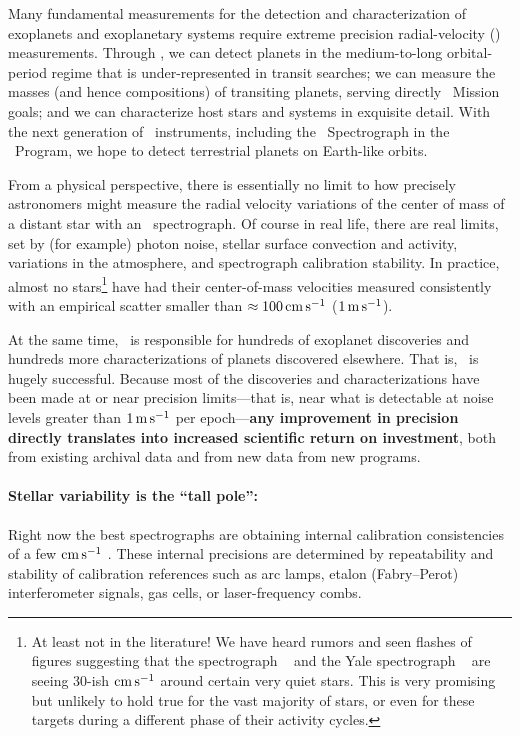 \documentclass[12pt, letterpaper]{article}
\begin{document}
\sloppy\sloppypar\raggedbottom\frenchspacing


Many fundamental measurements for the detection and characterization of 
exoplanets and exoplanetary systems require extreme precision radial-velocity (\EPRV)
measurements.
Through \EPRV, we can detect planets in the medium-to-long 
orbital-period regime that is under-represented in transit searches;
we can measure the 
masses (and hence compositions) of transiting planets,
serving directly \TESS\ Mission goals;
and we can characterize host stars and systems in exquisite detail.
With the next generation of \EPRV\ 
instruments, including the \NEID\ Spectrograph in the \NNEXPLORE\ Program,
we hope to detect terrestrial planets on Earth-like orbits.

From a physical perspective, there is essentially no limit to how
precisely astronomers might measure the radial velocity variations
of the center of mass of a distant star with an \EPRV\ spectrograph.
Of course in real life, there are real limits, set
by (for example) photon noise, stellar surface convection and activity,
variations in the atmosphere, and spectrograph calibration stability.
In practice, almost no stars\footnote{%
  At least not in the literature! We have heard rumors and 
  seen flashes of figures suggesting that the  spectrograph
  \ESPRESSO\ \citep{Pepe2010} and the Yale spectrograph \EXPRES\ 
  \citep{Jurgenson2016} are seeing 
  30-ish ${\mathrm{cm\,s^{-1}}}$ around certain very quiet stars. This is very promising but 
  unlikely to hold true for the vast majority of stars, or even for these targets during a
  different phase of their activity cycles.}
have had their center-of-mass
velocities measured consistently with an empirical scatter
smaller than $\approx 100\,{\mathrm{cm\,s^{-1}}}$ 
($1\,{\mathrm{m\,s^{-1}}}$).

At the same time, \EPRV\ is responsible for hundreds of  exoplanet discoveries and hundreds more \foreign{a
posteriori} characterizations of planets discovered elsewhere.
That is, \EPRV\ is hugely successful.
Because most of the discoveries and characterizations have been made
at or near precision limits---that is, near what is detectable at noise levels
greater than $1\,{\mathrm{m\,s^{-1}}}$ per epoch---\textbf{any improvement in precision directly
translates into increased scientific return on investment},
both from existing archival data and from new data from new programs.

\paragraph{Stellar variability is the ``tall pole'':}
Right now the best spectrographs are obtaining internal calibration
consistencies of a few ${\mathrm{cm\,s^{-1}}}$ \citep{espresso-eprv4, expres-eprv4}.
These internal precisions are determined by repeatability and
stability of calibration references such as arc lamps, etalon
(Fabry--Perot) interferometer signals, gas cells, or laser-frequency
combs.
\end{document}
